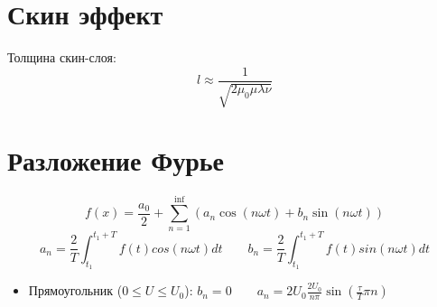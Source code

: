\documentclass{article}
\begin{document}
\section{Скин эффект}
Толщина скин-слоя:
\[l \approx \frac{1}{\sqrt{2\mu_0\mu\lambda\nu}}\]

\section{Разложение Фурье}
\[f(x)=\frac{a_0}{2} + \sum_{n=1}^{\inf}(a_n \cos (n \omega t) + b_n \sin (n \omega t))\]
\[a_n = \frac{2}{T}\int_{t_1}^{t_1+T}f(t)cos(n\omega t)dt \qquad b_n = \frac{2}{T}\int_{t_1}^{t_1+T}f(t)sin(n\omega t)dt\]
\begin{itemize}
    \item Прямоугольник ($0\le U \le U_0$): $b_n=0 \qquad a_n=2U_0\frac{2U_0}{n\pi}\sin(\frac{\tau}{T}\pi n)$
\end{itemize}
\end{document}
